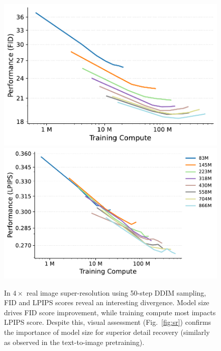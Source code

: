 \begin{figure}[t]
\centering
\includegraphics[height=.315\linewidth]{cp2/figures/sr_fid_compute.pdf}
\includegraphics[height=.315\linewidth]{cp2/figures/sr_lpips_compute.pdf}
\caption{In $4\times$ real image super-resolution using 50-step DDIM sampling, FID and LPIPS scores reveal an interesting divergence. Model size drives FID score improvement, while training compute most impacts LPIPS score. Despite this, visual assessment (Fig.~\ref{fig:sr}) confirms the importance of model size for superior detail recovery (similarly as observed in the text-to-image pretraining).
}
\label{fig:sr_compute}
\end{figure}

